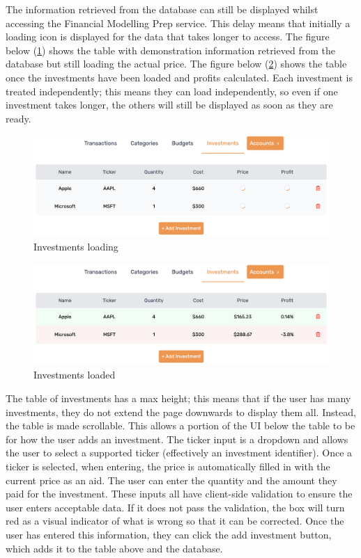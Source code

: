 The information retrieved from the database can still be displayed whilst accessing the Financial Modelling Prep service. This delay means that initially a loading icon is displayed for the data that takes longer to access. The figure below (\ref{fig:InvestmentsLoading}) shows the table with demonstration information retrieved from the database but still loading the actual price. The figure below (\ref{fig:InvestmentsLoaded}) shows the table once the investments have been loaded and profits calculated. Each investment is treated independently; this means they can load independently, so even if one investment takes longer, the others will still be displayed as soon as they are ready.

\begin{figure}[H]
	\centering
	\includegraphics[width=\textwidth]{images/investments_loading.png}
	\caption{Investments loading}
	\label{fig:InvestmentsLoading}
\end{figure}

\begin{figure}[H]
	\centering
	\includegraphics[width=\textwidth]{images/investments_loaded.png}
	\caption{Investments loaded}
	\label{fig:InvestmentsLoaded}
\end{figure}

The table of investments has a max height; this means that if the user has many investments, they do not extend the page downwards to display them all. Instead, the table is made scrollable. This allows a portion of the UI below the table to be for how the user adds an investment. The ticker input is a dropdown and allows the user to select a supported ticker (effectively an investment identifier). Once a ticker is selected, when entering, the price is automatically filled in with the current price as an aid. The user can enter the quantity and the amount they paid for the investment. These inputs all have client-side validation to ensure the user enters acceptable data. If it does not pass the validation, the box will turn red as a visual indicator of what is wrong so that it can be corrected. Once the user has entered this information, they can click the add investment button, which adds it to the table above and the database.

